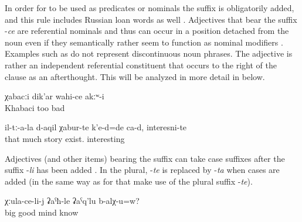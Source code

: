In order for  to be used as predicates  or nominals  the suffix is obligatorily added, and this rule includes Russian loan words as well . Adjectives that bear the suffix -\textit{ce} are referential nominals and thus can occur in a position detached from the noun even if they semantically rather seem to function as nominal modifiers . Examples such as  do not represent discontinuous noun phrases. The adjective is rather an independent referential constituent that occurs to the right of the clause as an afterthought. This will be analyzed in more detail in  below.

\begin{exe}
	\ex	\label{ex:Khabaci (name) was also not bad minor}
	\gll	χabacːi	dik'ar	wahi-ce	akːʷ-i\\
		Khabaci	too	bad	\\
	\glt	{}

	\ex	\label{ex:About them there were, are many stories, interesting (ones) minor@19c}
	\gll	il-tː-a-la	d-aqil	χabur-te	k'e-d=de	ca-d,	interesni-te\\
		that	much	story	exist.		interesting\\
	\glt	{}

\end{exe}

Adjectives (and other items) bearing the suffix can take case suffixes after the  suffix -\textit{li} has been added . In the plural, -\textit{te} is replaced by -\textit{ta} when cases are added (in the same way as for  that make use of the plural suffix -\textit{te}). 

\begin{exe}
	\ex	\label{ex:Does an older (person) know it better minor}
	\gll	χːula-ce-li-j	ʡaˁħ-le	ʡaˁq'lu	b-alχ-u=w?\\
		big	good	mind	know\\
	\glt	{}
\end{exe}

